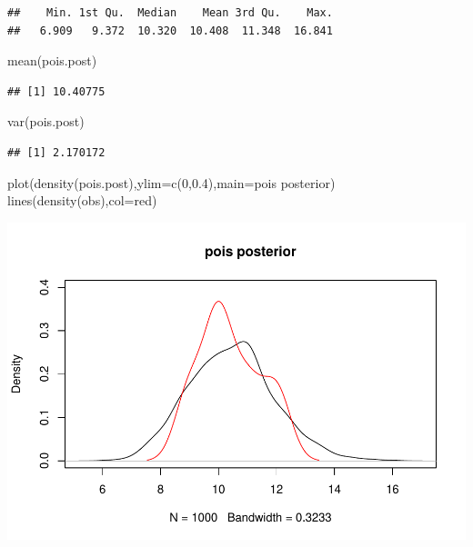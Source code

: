 \documentclass[
]{book}
\newenvironment{Shaded}{\begin{snugshade}}{\end{snugshade}}
\newcommand{\AttributeTok}[1]{\textcolor[rgb]{0.77,0.63,0.00}{#1}}
\newcommand{\DecValTok}[1]{\textcolor[rgb]{0.00,0.00,0.81}{#1}}
\newcommand{\FloatTok}[1]{\textcolor[rgb]{0.00,0.00,0.81}{#1}}
\newcommand{\FunctionTok}[1]{\textcolor[rgb]{0.00,0.00,0.00}{#1}}
\newcommand{\NormalTok}[1]{#1}
\newcommand{\StringTok}[1]{\textcolor[rgb]{0.31,0.60,0.02}{#1}}
\theoremstyle{definition}
\theoremstyle{definition}
\theoremstyle{definition}
\theoremstyle{definition}
\theoremstyle{remark}
\begin{document}
\begin{verbatim}
##    Min. 1st Qu.  Median    Mean 3rd Qu.    Max. 
##   6.909   9.372  10.320  10.408  11.348  16.841
\end{verbatim}

\begin{Shaded}
\begin{Highlighting}[]
  \FunctionTok{mean}\NormalTok{(pois.post)}
\end{Highlighting}
\end{Shaded}

\begin{verbatim}
## [1] 10.40775
\end{verbatim}

\begin{Shaded}
\begin{Highlighting}[]
  \FunctionTok{var}\NormalTok{(pois.post)}
\end{Highlighting}
\end{Shaded}

\begin{verbatim}
## [1] 2.170172
\end{verbatim}

\begin{Shaded}
\begin{Highlighting}[]
  \FunctionTok{plot}\NormalTok{(}\FunctionTok{density}\NormalTok{(pois.post),}\AttributeTok{ylim=}\FunctionTok{c}\NormalTok{(}\DecValTok{0}\NormalTok{,}\FloatTok{0.4}\NormalTok{),}\AttributeTok{main=}\StringTok{\textquotesingle{}pois posterior\textquotesingle{}}\NormalTok{)}
  \FunctionTok{lines}\NormalTok{(}\FunctionTok{density}\NormalTok{(obs),}\AttributeTok{col=}\StringTok{\textquotesingle{}red\textquotesingle{}}\NormalTok{)}
\end{Highlighting}
\end{Shaded}

\includegraphics{_main_files/figure-latex/unnamed-chunk-39-2.pdf}
\end{document}
